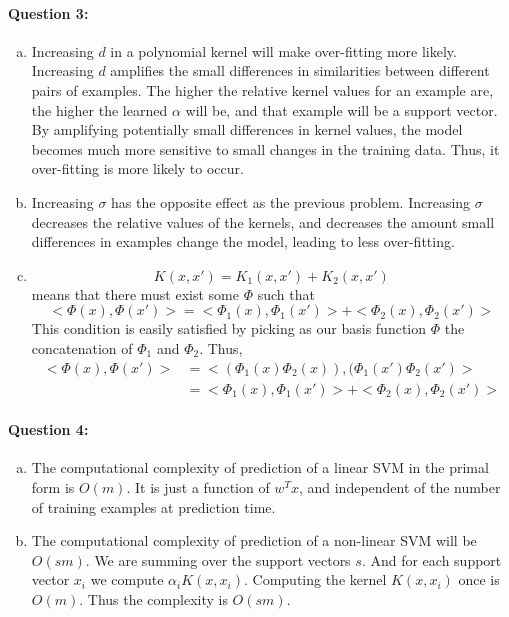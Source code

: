 \documentclass[letterpaper,11pt]{article}
\begin{document}
\paragraph{Question 3:}
\begin{enumerate}[(a)]
\item Increasing $d$ in a polynomial kernel will make over-fitting more likely. Increasing $d$ amplifies the small differences in similarities between different pairs of examples. The higher the relative kernel values for an example are, the higher the learned $\alpha$ will be, and that example will be a support vector. By amplifying potentially small differences in kernel values, the model becomes much more sensitive to small changes in the training data. Thus, it over-fitting is more likely to occur.
\item Increasing $\sigma$ has the opposite effect as the previous problem. Increasing $\sigma$ decreases the relative values of the kernels, and decreases the amount small differences in examples change the model, leading to less over-fitting.
\item
\begin{equation}
K(x, x') = K_1(x, x') + K_2(x, x')
\end{equation}
means that there must exist some $\Phi$ such that
\begin{equation}
<\Phi(x), \Phi(x')> = <\Phi_1(x), \Phi_1(x')> + <\Phi_2(x), \Phi_2(x')>
\end{equation}
This condition is easily satisfied by picking as our basis function $\Phi$ the concatenation of $\Phi_1$ and $\Phi_2$. Thus,
\begin{align}
<\Phi(x), \Phi(x')> &= <(\Phi_1(x)\Phi_2(x)), (\Phi_1(x')\Phi_2(x')>\\
                    &= <\Phi_1(x), \Phi_1(x')> + <\Phi_2(x), \Phi_2(x')>
\end{align}
\end{enumerate}

\paragraph{Question 4:}
\begin{enumerate}[(a)]
\item The computational complexity of prediction of a linear SVM in the primal form is $O(m)$. It is just a function of $w^T x$, and independent of the number of training examples at prediction time.
\item The computational complexity of prediction of a non-linear SVM will be $O(s m)$. We are summing over the support vectors $s$. And for each support vector $x_i$ we compute $\alpha_i K(x, x_i)$. Computing the kernel $K(x, x_i)$ once is $O(m)$. Thus the complexity is $O(s m)$.
\end{enumerate}
\end{document}
